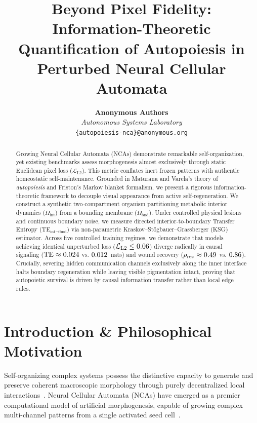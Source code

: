 \documentclass[10pt,twocolumn]{article}
\title{\textbf{Beyond Pixel Fidelity: Information-Theoretic Quantification of Autopoiesis in Perturbed Neural Cellular Automata}}
\author{
  \textbf{Anonymous Authors} \\
  \textit{Autonomous Systems Laboratory} \\
  \texttt{\{autopoiesis-nca\}@anonymous.org}
}
\date{}
\begin{document}
\maketitle

\begin{abstract}
Growing Neural Cellular Automata (NCAs) demonstrate remarkable self-organization, yet existing benchmarks assess morphogenesis almost exclusively through static Euclidean pixel loss ($\mathcal{L}_{\text{L2}}$). This metric conflates inert frozen patterns with authentic homeostatic self-maintenance. Grounded in Maturana and Varela's theory of \textit{autopoiesis} and Friston's Markov blanket formalism, we present a rigorous information-theoretic framework to decouple visual appearance from active self-regeneration. We construct a synthetic two-compartment organism partitioning metabolic interior dynamics ($\Omega_{\text{int}}$) from a bounding membrane ($\Omega_{\text{bnd}}$). Under controlled physical lesions and continuous boundary noise, we measure directed interior-to-boundary Transfer Entropy ($\text{TE}_{\text{int} \to \text{bnd}}$) via non-parametric Kraskov--St\"ogbauer--Grassberger (KSG) estimator. Across five controlled training regimes, we demonstrate that models achieving identical unperturbed loss ($\mathcal{L}_{\text{L2}} \le 0.06$) diverge radically in causal signaling ($\text{TE} \approx 0.024$ vs. $0.012$~nats) and wound recovery ($\rho_{\text{rec}} \approx 0.49$ vs. $0.86$). Crucially, severing hidden communication channels exclusively along the inner interface halts boundary regeneration while leaving visible pigmentation intact, proving that autopoietic survival is driven by causal information transfer rather than local edge rules.
\end{abstract}

\section{Introduction \& Philosophical Motivation}

Self-organizing complex systems possess the distinctive capacity to generate and preserve coherent macroscopic morphology through purely decentralized local interactions~\citep{maturana1980autopoiesis,mordvintsev2020growing}. Neural Cellular Automata (NCAs) have emerged as a premier computational model of artificial morphogenesis, capable of growing complex multi-channel patterns from a single activated seed cell~\citep{mordvintsev2020growing,randazzo2020adversarial}. 
\end{document}
